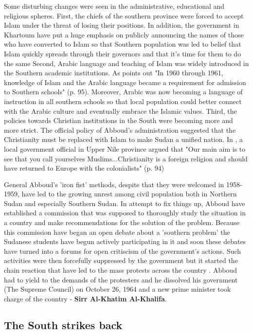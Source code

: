 \documentclass[14pt,a4paper]{article}
\begin{document}
Some disturbing changes were seen in the administrative, educational and religious spheres.
First, the chiefs of the southern province were forced to accept Islam under the threat of losing their positions. In addition, the government in Khartoum have put a huge emphasis on publicly announcing the names of those who have converted to Islam so that Southern population was led to belief that Islam quickly spreads through their governors and that it's time for them to do the same
Second, Arabic language and teaching of Islam was widely introduced in the Southern academic institutions. As \cite{poggo2008first} points out "In 1960 through 1961, knowledge of Islam and the Arabic language became a requirement for admission to Southern schools" (p. 95). Moreover, Arabic was now becoming a language of instruction in all southern schools so that local population could better connect with the Arabic culture and eventually embrace the Islamic values. 
Third, the policies towards Christian institutions in the South were becoming more and more strict. The official policy of Abboud's administration suggested that the Christianity must be replaced with Islam to make Sudan a unified nation. In \cite{poggo2008first}, a local government official in Upper Nile province argued that "Our main aim is to see that you call yourselves Muslims...Christianity is a foreign religion and should have returned to Europe with the colonialists" (p. 94)

General Abboud's 'iron fist' methods, despite that they were welcomed in 1958-1959, have led to the growing unrest among civil population both in Northern Sudan and especially Southern Sudan. 
In attempt to fix things up, Abboud have established a commission that was supposed to thoroughly study the situation in a country and make recommendations for the solution of the problem.
Because this commission have began an open debate about a 'southern problem' the Sudanese students have begun actively participating in it and soon these debates have turned into a forums for open critiscism of the government's actions. Such activities were then forcefully suppressed by the government but it started the chain reaction that have led to the mass protests across the country \cite{Berridge2014October}.
Abboud had to yield to the demands of the protesters and he dissolved his government (The Supreme Council) on October 26, 1964 and a new prime minister took charge of the country -  \textbf{Sirr Al-Khatim Al-Khalifa}. 

\subsection{The South strikes back}
\end{document}
